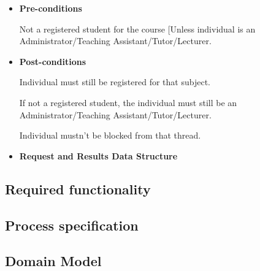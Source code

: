 \documentclass[a4paper,12pt]{report}
\begin{document}
\begin{itemize}
    \item\textbf{Pre-conditions}

	{Not a registered student for the course [Unless individual is an Administrator/Teaching Assistant/Tutor/Lecturer.}

    \item\textbf{Post-conditions }

	{Individual must still be registered for that subject.}

	{If not a registered student, the individual must still be an Administrator/Teaching Assistant/Tutor/Lecturer.}

	{Individual mustn't be blocked from that thread.}


    \item\textbf{Request and Results Data Structure} 

\end{itemize}

\subsection{Required functionality}

\subsection{Process specification}
\subsection{Domain Model}
	\begin{center}
	\end{center}
\newpage


{} %

\end{document}
